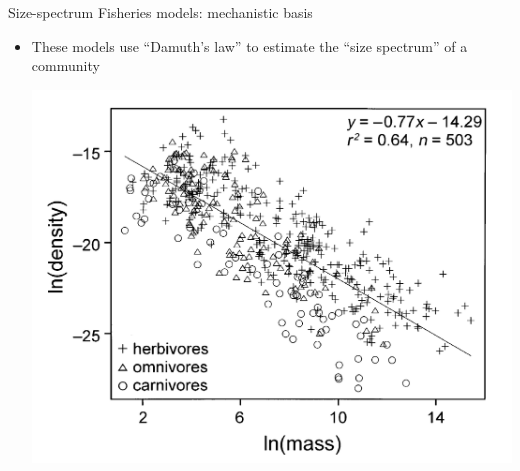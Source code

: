 \documentclass[xcolor={usenames,x11names},compress]{beamer}
\renewcommand{\(}{\begin{columns}}
\renewcommand{\)}{\end{columns}}
\newcommand{\<}[1]{\begin{column}{#1}}
\renewcommand{\>}{\end{column}}
\begin{document}
\begin{frame}{Size-spectrum Fisheries models: mechanistic basis}

  \begin{itemize}
    \item These models use ``Damuth's law'' to estimate the ``size spectrum'' of a community
     
    \centering 
    
    \includegraphics[width=.65\textwidth]{Damuth.png}

  \end{itemize}

\end{frame}
\end{document}
